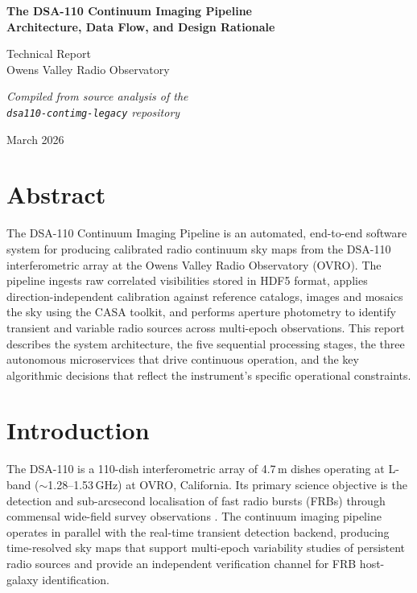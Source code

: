 \documentclass[12pt,a4paper]{article}
\begin{document}
\begin{titlepage}
  \centering
  \vspace*{3cm}
  {\LARGE\bfseries The DSA-110 Continuum Imaging Pipeline\\[0.4em]
   Architecture, Data Flow, and Design Rationale\par}
  \vspace{1.5cm}
  {\large Technical Report\\[0.3em]
   Owens Valley Radio Observatory\par}
  \vspace{1.2cm}
  {\normalsize\itshape
   Compiled from source analysis of the\\
   \texttt{dsa110-contimg-legacy} repository\par}
  \vfill
  {\normalsize March 2026}
\end{titlepage}

\section*{Abstract}

The DSA-110 Continuum Imaging Pipeline is an automated, end-to-end software
system for producing calibrated radio continuum sky maps from the DSA-110
interferometric array at the Owens Valley Radio Observatory (OVRO).  The
pipeline ingests raw correlated visibilities stored in HDF5 format, applies
direction-independent calibration against reference catalogs, images and
mosaics the sky using the CASA toolkit, and performs aperture photometry to
identify transient and variable radio sources across multi-epoch observations.
This report describes the system architecture, the five sequential processing
stages, the three autonomous microservices that drive continuous operation, and
the key algorithmic decisions that reflect the instrument's specific operational
constraints.

\section{Introduction}

The DSA-110 is a 110-dish interferometric array of 4.7\,m dishes operating at
L-band ($\sim$1.28--1.53\,GHz) at OVRO, California.  Its primary science
objective is the detection and sub-arcsecond localisation of fast radio bursts
(FRBs) through commensal wide-field survey observations
\cite{hallinan2019dsa}.  The continuum imaging pipeline operates in parallel
with the real-time transient detection backend, producing time-resolved sky
maps that support multi-epoch variability studies of persistent radio sources
and provide an independent verification channel for FRB host-galaxy
identification.
\end{document}
